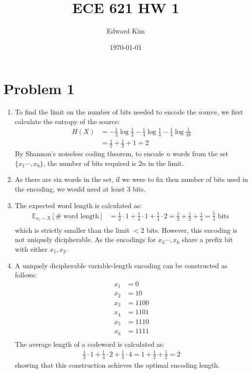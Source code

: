 \documentclass[12pt]{article}%
\begin{document}
\title{ECE 621 HW 1}
\author{Edward Kim}
\date{\today}
\maketitle

\section*{Problem 1}

\begin{enumerate}
  \item To find the limit on the number of bits needed to encode the source, we first calculate the entropy of the source:
  \begin{align*}
    H(X) & = -\frac{1}{2}\log{\frac{1}{2}}  -\frac{1}{4}\log{\frac{1}{4}}  -\frac{1}{4}\log{\frac{1}{16}} \\
    & = \frac{1}{2} + \frac{1}{2} + 1 = 2
  \end{align*}
  By Shannon's noiseless coding theorem, to encode $n$ words from the set $\{x_1\cdots,x_6\}$, the number of bits required is $2n$ in the limit.
  \item As there are six words in the set, if we were to fix then number of bits used in the encoding, we would need at least $3$ bits.
  \item The expected word length is calculated as:
  \begin{align*}
    \mathbb{E}_{x_i \sim X}\left[ \# \text{ word length}\right] & = \frac{1}{2} \cdot 1 + \frac{1}{4} \cdot 1 + \frac{1}{4}\cdot 2 = \frac{1}{2} + \frac{1}{2} + \frac{1}{4} = \frac{5}{4} \text{ bits }  \\
  \end{align*}
  which is strictly smaller than the limit $< 2$ bits.
  However, this encoding is not uniquely dicipherable. As the encodings for $x_3 \cdots, x_6$ share a prefix bit with either $x_1,x_2$.
  \item
  A uniquely dicipherable variable-length encoding can be constructed as follows:
  \begin{align*}
    x_1 & = 0 \\
    x_2 & = 10 \\
    x_3 & = 1100 \\
    x_4 & = 1101 \\
    x_5 & = 1110 \\
    x_6 & = 1111 \\
  \end{align*}
  The average length of a codeword is calculated as:
  \begin{align*}
    \frac{1}{2} \cdot 1 + \frac{1}{4} \cdot 2 + \frac{1}{4} \cdot 4 = 1 + \frac{1}{2} + \frac{1}{2} = 2
  \end{align*}
  showing that this construction achieves the optimal encoding length.


\end{enumerate}
\end{document}
